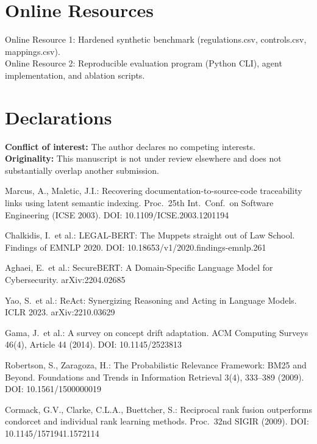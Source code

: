 \documentclass{sn-jnl}
\begin{document}
\section*{Online Resources}
Online Resource 1: Hardened synthetic benchmark (regulations.csv, controls.csv, mappings.csv).\\
Online Resource 2: Reproducible evaluation program (Python CLI), agent implementation, and ablation scripts.

\section*{Declarations}
\textbf{Conflict of interest:} The author declares no competing interests.\\
\textbf{Originality:} This manuscript is not under review elsewhere and does not substantially overlap another submission.

\begin{thebibliography}{}
Marcus, A., Maletic, J.I.: Recovering documentation-to-source-code traceability links using latent semantic indexing. Proc.\ 25th Int.\ Conf.\ on Software Engineering (ICSE 2003). DOI: 10.1109/ICSE.2003.1201194

Chalkidis, I.\ et al.: LEGAL-BERT: The Muppets straight out of Law School. Findings of EMNLP 2020. DOI: 10.18653/v1/2020.findings-emnlp.261

Aghaei, E.\ et al.: SecureBERT: A Domain-Specific Language Model for Cybersecurity. arXiv:2204.02685

Yao, S.\ et al.: ReAct: Synergizing Reasoning and Acting in Language Models. ICLR 2023. arXiv:2210.03629

Gama, J.\ et al.: A survey on concept drift adaptation. ACM Computing Surveys 46(4), Article 44 (2014). DOI: 10.1145/2523813

Robertson, S., Zaragoza, H.: The Probabilistic Relevance Framework: BM25 and Beyond. Foundations and Trends in Information Retrieval 3(4), 333--389 (2009). DOI: 10.1561/1500000019

Cormack, G.V., Clarke, C.L.A., Buettcher, S.: Reciprocal rank fusion outperforms condorcet and individual rank learning methods. Proc.\ 32nd SIGIR (2009). DOI: 10.1145/1571941.1572114

\end{thebibliography}
\end{document}
